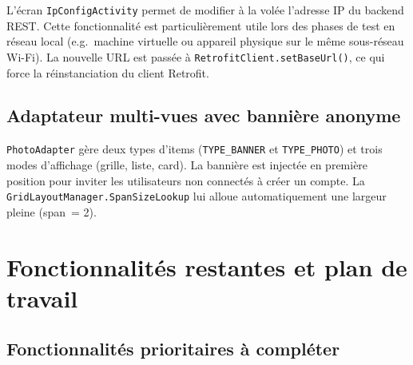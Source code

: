 \documentclass[12pt, a4paper]{report}
\begin{document}
L'écran \texttt{IpConfigActivity} permet de modifier à la volée l'adresse IP du backend
REST. Cette fonctionnalité est particulièrement utile lors des phases de test en réseau
local (e.g.\ machine virtuelle ou appareil physique sur le même sous-réseau Wi-Fi). La
nouvelle URL est passée à \texttt{RetrofitClient.setBaseUrl()}, ce qui force la
réinstanciation du client Retrofit.

\section{Adaptateur multi-vues avec bannière anonyme}

\texttt{PhotoAdapter} gère deux types d'items (\texttt{TYPE\_BANNER} et \texttt{TYPE\_PHOTO})
et trois modes d'affichage (grille, liste, card). La bannière est injectée en première
position pour inviter les utilisateurs non connectés à créer un compte. La
\texttt{GridLayoutManager.SpanSizeLookup} lui alloue automatiquement une largeur pleine
(span~= 2).

\chapter{Fonctionnalités restantes et plan de travail}

\section{Fonctionnalités prioritaires à compléter}
\end{document}

